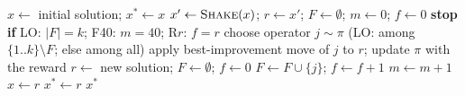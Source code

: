 \begin{algorithm}[h]
\caption{Generic search loop. $B$ is the budget; policy $\pi$, acceptance $\in\{\textit{best},\textit{shaken}\}$, termination $\in\{\textrm{LO},\textrm{F40},\textrm{R}r\}$.}\label{alg:loop}
\begin{algorithmic}[1]
\State $x\gets$ initial solution; $x^*\gets x$
  \State $x'\gets \textsc{Shake}(x)$;\; $r\gets x'$;\; $F\gets\emptyset$;\; $m\gets 0$;\; $f\gets 0$
    \State \textbf{stop if} LO: $|F|=k$;\; F40: $m=40$;\; R$r$: $f=r$
    \State choose operator $j\sim\pi$ (LO: among $\{1..k\}\setminus F$; else among all)
    \State apply best-improvement move of $j$ to $r$; update $\pi$ with the reward
     $r\gets$ new solution;\; $F\gets\emptyset$;\; $f\gets 0$ \Else\; $F\gets F\cup\{j\}$;\; $f\gets f+1$ \EndIf
    \State $m\gets m+1$
  \EndWhile
    \State $x\gets r$
     \State $x^*\gets r$ \EndIf
  \EndIf
\EndWhile
\State \Return $x^*$
\end{algorithmic}
\end{algorithm}
